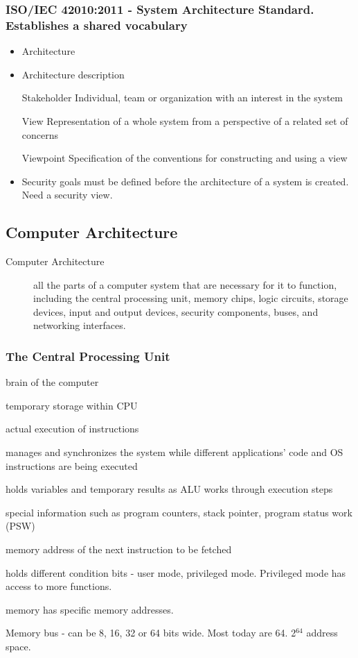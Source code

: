 \documentclass[11pt]{article}
\begin{document}
\subsubsection{ISO/IEC 42010:2011 - System Architecture Standard. Establishes a shared vocabulary}
\label{sec:orgcbde969}
\begin{itemize}
\item Architecture
\item Architecture description
\item[{Stakeholder}] Individual, team or organization with an interest in the system
\item[{View}] Representation of a whole system from a perspective of a related set of concerns
\item[{Viewpoint}] Specification of the conventions for constructing and using a view
\item Security goals must be defined before the architecture of a system is created. Need a security view.
\end{itemize}
\subsection{Computer Architecture}
\label{sec:orgd7d7188}
\begin{description}
\item[{Computer Architecture}] all the parts of a computer system that are necessary for it to function, including the central processing unit, memory chips, logic circuits, storage devices, input and output devices, security components, buses, and networking interfaces.
\end{description}
\subsubsection{The Central Processing Unit}
\label{sec:orgcdd9665}
\begin{description}
\item[{CPU}] brain of the computer
\item[{register}] temporary storage within CPU
\item[{arithmetic logic unit}] actual execution of instructions
\item[{control unit}] manages and synchronizes the system while different applications' code and OS instructions are being executed
\item[{General registers}] holds variables and temporary results as ALU works through execution steps
\item[{special registers}] special information such as program counters, stack pointer, program status work (PSW)
\item[{program counter}] memory address of the next instruction to be fetched
\item[{program status word}] holds different condition bits - user mode, privileged mode. Privileged mode has access to more functions.
\item memory has specific memory addresses.
\item Memory bus - can be 8, 16, 32 or 64 bits wide. Most today are 64. 2\(^{\text{64}}\) address space.
\end{description}
\end{document}
